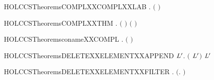 \newcommand{\HOLCCSTheoremsCOMPLXXCOMPLXXACT}{\UseVerbatim{HOLCCSTheoremsCOMPLXXCOMPLXXACT}}
\begin{SaveVerbatim}{HOLCCSTheoremsCOMPLXXCOMPLXXLAB}
\HOLTokenTurnstile{} \HOLSymConst{\HOLTokenForall{}}.  \ensuremath{(} \ensuremath{)} \HOLSymConst{\ensuremath{=}} 
\end{SaveVerbatim}
\newcommand{\HOLCCSTheoremsCOMPLXXCOMPLXXLAB}{\UseVerbatim{HOLCCSTheoremsCOMPLXXCOMPLXXLAB}}
\begin{SaveVerbatim}{HOLCCSTheoremsCOMPLXXTHM}
\HOLTokenTurnstile{} \HOLSymConst{\HOLTokenForall{}} .
       \ensuremath{(} \HOLSymConst{\HOLTokenNotEqual{}}   \HOLSymConst{\HOLTokenImp{}}   \HOLSymConst{\HOLTokenNotEqual{}}  \ensuremath{)} \HOLSymConst{\HOLTokenConj{}}
       \ensuremath{(} \HOLSymConst{\HOLTokenNotEqual{}}   \HOLSymConst{\HOLTokenImp{}}   \HOLSymConst{\HOLTokenNotEqual{}}  \ensuremath{)}
\end{SaveVerbatim}
\newcommand{\HOLCCSTheoremsCOMPLXXTHM}{\UseVerbatim{HOLCCSTheoremsCOMPLXXTHM}}
\begin{SaveVerbatim}{HOLCCSTheoremsconameXXCOMPL}
\HOLTokenTurnstile{} \HOLSymConst{\HOLTokenForall{}}.   \HOLSymConst{\ensuremath{=}}  \ensuremath{(} \ensuremath{)}
\end{SaveVerbatim}
\newcommand{\HOLCCSTheoremsconameXXCOMPL}{\UseVerbatim{HOLCCSTheoremsconameXXCOMPL}}
\begin{SaveVerbatim}{HOLCCSTheoremsDELETEXXELEMENTXXAPPEND}
\HOLTokenTurnstile{} \HOLSymConst{\HOLTokenForall{}}  \ensuremath{\HOLBoundVar{L}\sp{\prime}}.
         \ensuremath{(} \HOLSymConst{++} \ensuremath{\HOLBoundVar{L}\sp{\prime}}\ensuremath{)} \HOLSymConst{\ensuremath{=}}
          \HOLSymConst{++}   \ensuremath{\HOLBoundVar{L}\sp{\prime}}
\end{SaveVerbatim}
\newcommand{\HOLCCSTheoremsDELETEXXELEMENTXXAPPEND}{\UseVerbatim{HOLCCSTheoremsDELETEXXELEMENTXXAPPEND}}
\begin{SaveVerbatim}{HOLCCSTheoremsDELETEXXELEMENTXXFILTER}
\HOLTokenTurnstile{} \HOLSymConst{\HOLTokenForall{}} .    \HOLSymConst{\ensuremath{=}}  \ensuremath{(}\HOLTokenLambda{}.  \HOLSymConst{\HOLTokenNotEqual{}} \ensuremath{)} 
\end{SaveVerbatim}
